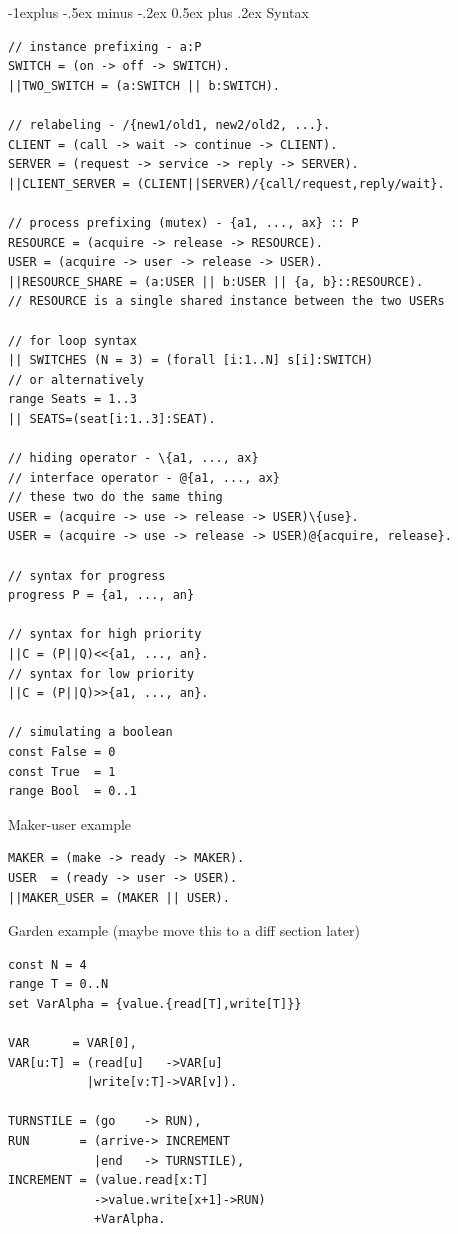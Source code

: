 \documentclass[letterpaper, 8pt]{extarticle}
\makeatletter
\renewcommand{\subsection}{\@startsection{subsection}{2}{0mm}%
                                {-1explus -.5ex minus -.2ex}%
                                {0.5ex plus .2ex}%
                                {\normalfont\small\bfseries}}
\makeatother
\begin{document}
\begin{multicols*}{5}
  \subsection{Syntax}
  \begin{lstlisting}
// instance prefixing - a:P
SWITCH = (on -> off -> SWITCH).
||TWO_SWITCH = (a:SWITCH || b:SWITCH).

// relabeling - /{new1/old1, new2/old2, ...}.
CLIENT = (call -> wait -> continue -> CLIENT).
SERVER = (request -> service -> reply -> SERVER).
||CLIENT_SERVER = (CLIENT||SERVER)/{call/request,reply/wait}.

// process prefixing (mutex) - {a1, ..., ax} :: P
RESOURCE = (acquire -> release -> RESOURCE).
USER = (acquire -> user -> release -> USER).
||RESOURCE_SHARE = (a:USER || b:USER || {a, b}::RESOURCE).
// RESOURCE is a single shared instance between the two USERs

// for loop syntax
|| SWITCHES (N = 3) = (forall [i:1..N] s[i]:SWITCH)
// or alternatively
range Seats = 1..3
|| SEATS=(seat[i:1..3]:SEAT).

// hiding operator - \{a1, ..., ax}
// interface operator - @{a1, ..., ax}
// these two do the same thing
USER = (acquire -> use -> release -> USER)\{use}.
USER = (acquire -> use -> release -> USER)@{acquire, release}.

// syntax for progress
progress P = {a1, ..., an}

// syntax for high priority
||C = (P||Q)<<{a1, ..., an}.
// syntax for low priority
||C = (P||Q)>>{a1, ..., an}.

// simulating a boolean
const False = 0
const True  = 1
range Bool  = 0..1
\end{lstlisting}

  Maker-user example
  \begin{lstlisting}
MAKER = (make -> ready -> MAKER).
USER  = (ready -> user -> USER).
||MAKER_USER = (MAKER || USER).
\end{lstlisting}

  Garden example (maybe move this to a diff section later)
  \begin{lstlisting}
const N = 4
range T = 0..N
set VarAlpha = {value.{read[T],write[T]}}

VAR      = VAR[0],
VAR[u:T] = (read[u]   ->VAR[u] 
           |write[v:T]->VAR[v]).

TURNSTILE = (go    -> RUN),
RUN       = (arrive-> INCREMENT
            |end   -> TURNSTILE),
INCREMENT = (value.read[x:T]
            ->value.write[x+1]->RUN)
            +VarAlpha.


\end{lstlisting}
\end{multicols*}
\end{document}
